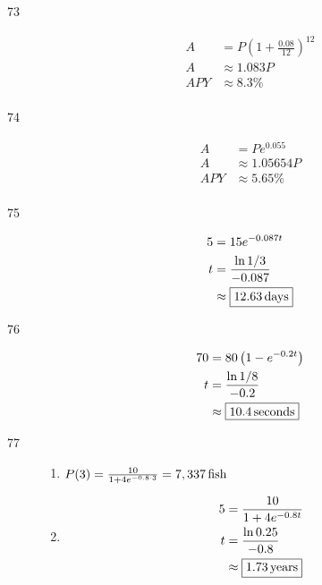 \documentclass{exam}
\begin{document}
\begin{description}
      \item[73]
        \begin{align*}
          A   & = P \left( 1 + \frac{0.08}{12} \right)^{12} \\
          A   & \approx 1.083 P \\
          APY & \approx \boxed{8.3\%} \\
        \end{align*}

      \item[74]
        \begin{align*}
          A   & = P e^{0.055} \\
          A   & \approx 1.05654 P \\
          APY & \approx \boxed{5.65\%} \\
        \end{align*}

      \item[75]
        \begin{align*}
          5 &= 15 e^{-0.087t} \\
          t &= \frac{\ln 1/3}{-0.087} \\
            &\approx \boxed{\unit[12.63]{days}} \\
        \end{align*}

      \item[76]
        \begin{align*}
          70          &= 80 \left( 1 - e^{-0.2t} \right) \\
          t           &= \frac{\ln 1/8}{-0.2} \\
                      &\approx \boxed{\unit[10.4]{seconds}} \\
        \end{align*}

      \item[77]
        \begin{enumerate}[a]
          \item $P(3) = \frac{10}{1 + 4e^{-0.8 \cdot 3}} = \unit[7,337]{fish}$

          \item 
            \begin{align*}
              5 &= \frac{10}{1 + 4e^{-0.8t}} \\
              t &= \frac{\ln 0.25}{-0.8} \\
                &\approx \boxed{\unit[1.73]{years}} \\
            \end{align*}
        \end{enumerate}


\end{description}
\end{document}
